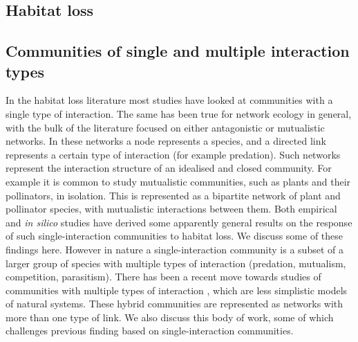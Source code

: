 \subsection{Habitat loss}
\label{sec:intro_habitat_loss}

\subsection{Communities of single and multiple interaction types} 
\label{sec:intro_multiple_interaction_types}

In the habitat loss literature most studies have looked at communities with a single type of interaction. The same has been true for network ecology in general, with the bulk of the literature focused on either antagonistic or mutualistic networks. In these networks a node represents a species, and a directed link represents a certain type of interaction (for example predation). Such networks represent the interaction structure of an idealised and closed community. For example it is common to study mutualistic communities, such as plants and their pollinators, in isolation. This is represented as a bipartite network of plant and pollinator species, with mutualistic interactions between them. Both empirical and \emph{in silico} studies have derived some apparently general results on the response of such single-interaction communities to habitat loss. We discuss some of these findings here. However in nature a single-interaction community is a subset of a larger group of species  with multiple types of interaction (predation, mutualism, competition, parasitism). There has been a recent move towards studies of communities with multiple types of interaction \cite{kefi2012more}, which are less simplistic models of natural systems. These hybrid communities are represented as networks with more than one type of link. We also discuss this body of work, some of which challenges previous finding based on single-interaction communities.     


